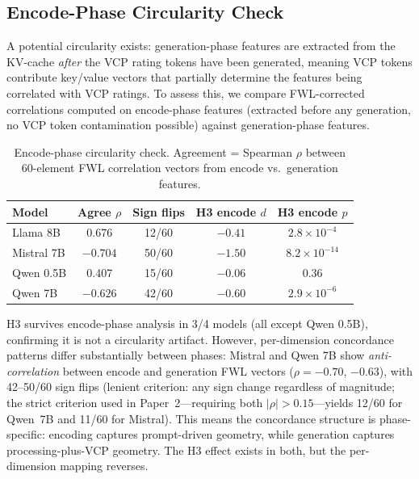 \documentclass[11pt,a4paper]{article}
\begin{document}
\subsection{Encode-Phase Circularity Check}
\label{sec:circularity}

A potential circularity exists: generation-phase features are extracted from the KV-cache \emph{after} the VCP rating tokens have been generated, meaning VCP tokens contribute key/value vectors that partially determine the features being correlated with VCP ratings. To assess this, we compare FWL-corrected correlations computed on encode-phase features (extracted before any generation, no VCP token contamination possible) against generation-phase features.

\begin{table}[H]
\centering
\caption{Encode-phase circularity check. Agreement = Spearman $\rho$ between 60-element FWL correlation vectors from encode vs.\ generation features.}
\label{tab:circularity}
\begin{tabular}{lcccc}
\toprule
\textbf{Model} & \textbf{Agree $\rho$} & \textbf{Sign flips} & \textbf{H3 encode $d$} & \textbf{H3 encode $p$} \\
\midrule
Llama 8B    & 0.676  & 12/60 & $-0.41$ & $2.8 \times 10^{-4}$ \\
Mistral 7B  & $-0.704$ & 50/60 & $-1.50$ & $8.2 \times 10^{-14}$ \\
Qwen 0.5B   & 0.407  & 15/60 & $-0.06$ & 0.36 \\
Qwen 7B     & $-0.626$ & 42/60 & $-0.60$ & $2.9 \times 10^{-6}$ \\
\bottomrule
\end{tabular}
\end{table}

H3 survives encode-phase analysis in 3/4 models (all except Qwen 0.5B), confirming it is not a circularity artifact. However, per-dimension concordance patterns differ substantially between phases: Mistral and Qwen 7B show \emph{anti-correlation} between encode and generation FWL vectors ($\rho = -0.70$, $-0.63$), with 42--50/60 sign flips (lenient criterion: any sign change regardless of magnitude; the strict criterion used in Paper~2---requiring both $|\rho| > 0.15$---yields 12/60 for Qwen~7B and 11/60 for Mistral). This means the concordance structure is phase-specific: encoding captures prompt-driven geometry, while generation captures processing-plus-VCP geometry. The H3 effect exists in both, but the per-dimension mapping reverses.
\end{document}

